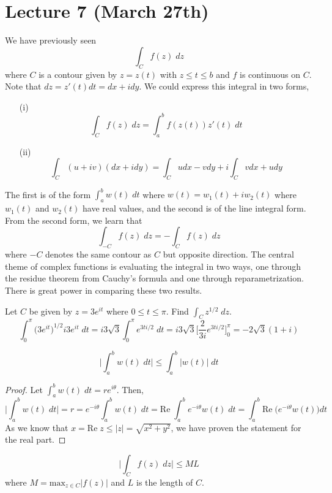 \section{Lecture 7 (March 27th)}
\begin{recall}
We have previously seen
	\[\int _{C}f(z)\;dz\]
where $C$ is a contour given by $z=z(t)$ with $z\leq t\leq b$ and $f$ is continuous on $C$. Note that $dz=z'(t)dt=dx+idy$. We could express this integral in two forms,
\begin{itemize}
\item[(i)] \[\int _{C}f(z)\;dz=\int ^{b}_{a}f(z(t))z'(t)\;dt\]
\item[(ii)] \[\int _{C}(u+iv)(dx+idy)=\int_{C}udx-vdy+i\int _{C}vdx+udy \]
\end{itemize}
The first is of the form $\int ^{b}_{a}w(t)\;dt$ where $w (t)=w _{1}(t)+iw _{2}(t)$ where $w_1(t)$ and $w_2(t)$ have real values, and the second is of the line integral form. From the second form, we learn that
\[\int _{-C}f(z)\;dz=-\int _{C}f(z)\;dz\]
where $-C$ denotes the same contour as $C$ but opposite direction. The central theme of complex functions is evaluating the integral in two ways, one through the residue theorem from Cauchy's formula and one through reparametrization. There is great power in comparing these two results. 
\end{recall}
\vspace{2ex}
\begin{ex}
Let $C$ be given by $z=3e^{it}$ where $0\leq t\leq \pi$. Find $\int _{C}z^{1/2}\;dz$. 
	\[\int ^{\pi }_{0}\Big(3e^{it}\Big)^{1/2}i 3e^{it}\;dt=i3\sqrt{3}\int _{0}^{\pi }e^{3ti/2}\;dt=i3\sqrt{3}\Big[\dfrac{2}{3i}e^{3ti/2}\Big]^{\pi }_{0}=-2\sqrt{3}(1+i)\]
\end{ex}
\begin{thm}
\[\Big|\int _{a}^{b}w (t)\;dt\Big|\leq \int _{a}^{b}|w (t)|\;dt\]
\end{thm}
\vspace{2ex}
\begin{proof}
	Let $\int ^{b}_{a}w(t)\;dt=re^{i\theta }$. Then,
	\[\Big|\int ^{b}_{a}w(t)\;dt\Big|=r=e^{-i\theta }\int ^{b}_{a}w(t)\;dt=\mathrm{Re}\;\int _{a}^{b}e^{-i\theta }w(t)\;dt=\int ^{b}_{a}\mathrm{Re}\;\Big(e^{-i\theta }w(t)\Big)dt\]
As we know that $x=\mathrm{Re}\;z\leq |z|=\sqrt{x^2+y^2}$, we have proven the statement for the real part.
\end{proof}
\vspace{2ex}
\begin{thm}
\[\Big| \int _{C}f(z)\;dz\Big|\leq ML\]
	where $M=\mathrm{max}_{z\in C}|f(z)|$ and $L$ is the length of $C$.
\end{thm}
